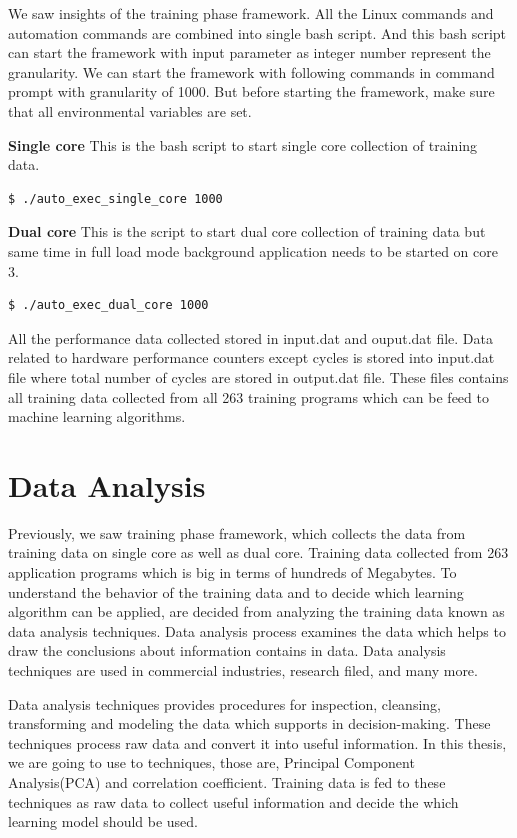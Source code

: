 \par We saw insights of the training phase framework.  All the Linux commands and automation commands are combined into single bash script. And this bash script can start the framework with input parameter as integer number represent the granularity. We can start the framework with following commands in command prompt with granularity of 1000. But before starting the framework, make sure that all environmental variables are set. 

\textbf{Single core}
This is the bash script to start single core collection of training data.
\begin{lstlisting}
$ ./auto_exec_single_core 1000
\end{lstlisting}

\textbf{Dual core}
This is the script to start dual core collection of training data but same time in full load mode background application needs to be started on core 3. 
\begin{lstlisting}
$ ./auto_exec_dual_core 1000
\end{lstlisting}

\par All the performance data collected stored in input.dat and ouput.dat file. Data related to hardware performance counters except cycles is stored into input.dat file where total number of cycles are stored in output.dat file. These files contains all training data collected from all 263 training programs which can be feed to machine learning algorithms. 


\section{Data Analysis}
Previously, we saw training phase framework, which collects the data from training data on single core as well as dual core. Training data collected from 263 application programs which is big in terms of hundreds of Megabytes. To understand the behavior of the training data and to decide which learning algorithm can be applied, are decided from analyzing the training data known as data analysis techniques. Data analysis process examines the data which helps to draw the conclusions about information contains in data. Data analysis techniques are used in commercial industries, research filed, and many more. 

\par Data analysis techniques provides procedures for inspection, cleansing, transforming and modeling the data which supports in decision-making. These techniques process raw data and convert it into useful information. In this thesis, we are going to use to techniques, those are, Principal Component Analysis(PCA) and correlation coefficient. Training data is fed to these techniques as raw data to collect useful information and decide the which learning model should be used. 

